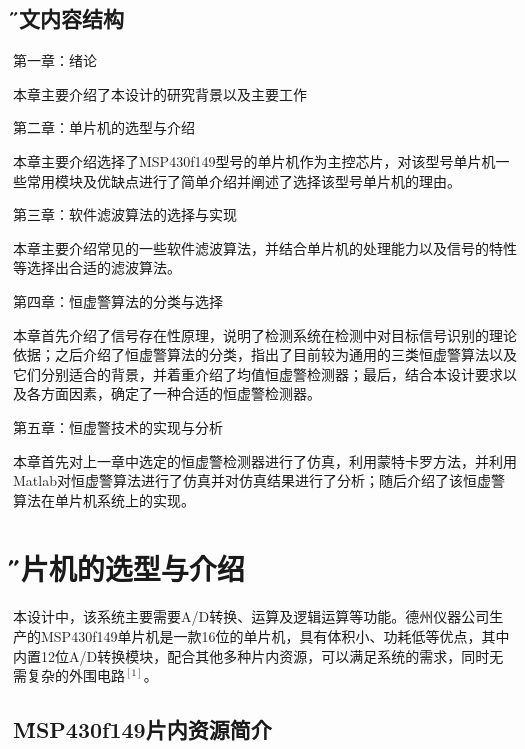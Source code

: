 \documentclass[12pt,a4paper]{article} %
\newcommand{\xiaosanhao}{\fontsize{15pt}{\baselineskip}\selectfont}    %
\begin{document}
 	  \subsection{\H 论文内容结构}
第一章：绪论
         \par 本章主要介绍了本设计的研究背景以及主要工作
\par 第二章：单片机的选型与介绍
          \par 本章主要介绍选择了MSP430f149型号的单片机作为主控芯片，对该型号单片机一些常用模块及优缺点进行了简单介绍并阐述了选择该型号单片机的理由。
           \par 第三章：软件滤波算法的选择与实现
          \par 本章主要介绍常见的一些软件滤波算法，并结合单片机的处理能力以及信号的特性等选择出合适的滤波算法。
            \par 第四章：恒虚警算法的分类与选择
            \par 本章首先介绍了信号存在性原理，说明了检测系统在检测中对目标信号识别的理论依据；之后介绍了恒虚警算法的分类，指出了目前较为通用的三类恒虚警算法以及它们分别适合的背景，并着重介绍了均值恒虚警检测器；最后，结合本设计要求以及各方面因素，确定了一种合适的恒虚警检测器。
             \par 第五章：恒虚警技术的实现与分析
             \par 本章首先对上一章中选定的恒虚警检测器进行了仿真，利用蒙特卡罗方法，并利用Matlab对恒虚警算法进行了仿真并对仿真结果进行了分析；随后介绍了该恒虚警算法在单片机系统上的实现。
               
               
               
               
                  
                   
                   
                   
\newpage


\section{\xiaosanhao \H  单片机的选型与介绍}
 本设计中，该系统主要需要A/D转换、运算及逻辑运算等功能。德州仪器公司生产的MSP430f149单片机是一款16位的单片机，具有体积小、功耗低等优点，其中内置12位A/D转换模块，配合其他多种片内资源，可以满足系统的需求，同时无需复杂的外围电路$^{[1]}$。
	 \subsection{\H MSP430f149片内资源简介}
	 	
\end{document}
